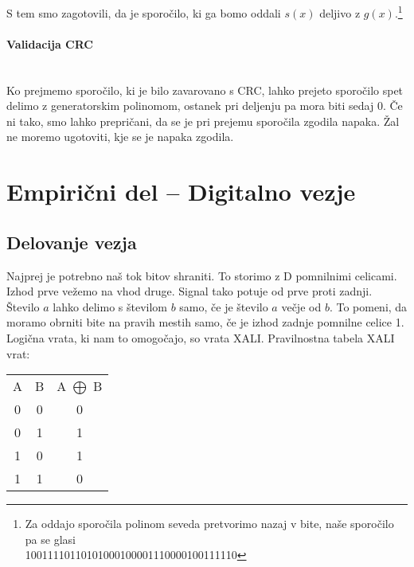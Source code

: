 \documentclass[12pt]{article}
\begin{document}
            S tem smo zagotovili, da je sporočilo, ki ga bomo oddali $s(x)$ 
            deljivo z $g(x)$.\footnote{Za oddajo sporočila polinom seveda 
            pretvorimo nazaj v bite, naše sporočilo pa se glasi\\ 
            10011110110101000100001110000100111110}
            
            \paragraph{Validacija CRC} \mbox{}\\
            Ko prejmemo sporočilo, ki je bilo zavarovano s CRC, lahko prejeto 
            sporočilo spet delimo z generatorskim polinomom, ostanek pri 
            deljenju pa mora biti sedaj 0. Če ni tako, smo lahko prepričani,
            da se je pri prejemu sporočila zgodila napaka. Žal ne moremo 
            ugotoviti, kje se je napaka zgodila.

\newpage
\section{Empirični del – Digitalno vezje}
    \subsection{Delovanje vezja}
        Najprej je potrebno naš tok bitov shraniti. To storimo z D pomnilnimi
        celicami. Izhod prve vežemo na vhod druge. Signal tako potuje od prve 
        proti zadnji. Število $a$ lahko delimo s številom $b$ samo, če je število
        $a$ večje od $b$. To pomeni, da moramo obrniti bite na pravih mestih
        samo, če je izhod zadnje pomnilne celice 1. Logična vrata, ki nam to 
        omogočajo, so vrata XALI. Pravilnostna tabela XALI vrat:
        \begin{table}[!h]
            \centering
            \begin{tabular}{c|c||c}
                A & B & A $\bigoplus$ B\\
                \cline{1-3}
                0 & 0 & 0\\
                0 & 1 & 1\\
                1 & 0 & 1\\
                1 & 1 & 0\\
            \end{tabular}
        \end{table}
\end{document}
